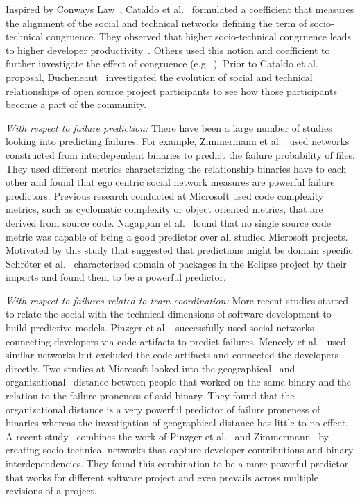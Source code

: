 Inspired by Conways Law~\cite{conway:datamination:1968}, Cataldo et
al.~\cite{cataldo:cscw:2006,cataldo:esem:2008} formulated a coefficient that
measures the alignment of the social and technical networks defining the term of
socio-technical congruence. They observed that higher socio-technical congruence
leads to higher developer
productivity~\cite{cataldo:cscw:2006,cataldo:esem:2008}. Others used this
notion and coefficient to further investigate the effect of congruence
(e.g.~\cite{valetto:msr:2007}). Prior to Cataldo et
al.~\cite{cataldo:cscw:2006,cataldo:esem:2008} proposal,
Ducheneaut~\cite{ducheneaut:cscw:2005} investigated the evolution of social and
technical relationships of open source project participants to see how those
participants become a part of the community.


\emph{With respect to failure prediction:}
There have been a large number of studies looking into predicting failures. For
example, Zimmermann et al.~\cite{zimmermann:icse:2008} used
networks constructed from interdependent binaries to predict the failure
probability of files. They used different metrics characterizing the relationship
binaries have to each other and found that ego centric social network measures
are powerful failure predictors. Previous research conducted at Microsoft used
code complexity metrics, such as cyclomatic complexity or object oriented
metrics, that are derived from source code. Nagappan et
al.~\cite{nagappan:icse:2006} found
that no single source code metric was capable of being a good
predictor over all studied Microsoft projects. Motivated by this study that
suggested that predictions might be domain specific Schr\"oter et
al.~\cite{schroeter:isese:2006} characterized domain of packages in the Eclipse
project by their imports and found them to be a powerful predictor.


\emph{With respect to failures related to team coordination:}
More recent studies started to relate the social with the technical
dimensions of software development to build predictive models. Pinzger et
al.~\cite{pinzger:fse:2008} successfully used social networks connecting
developers via code artifacts to predict failures. Meneely et
al.~\cite{meneely:fse:2008} used similar networks but excluded the code artifacts
and connected the developers directly. Two studies at Microsoft looked into the
geographical~\cite{bird:acm:2009} and organizational~\cite{nagappan:icse:2008}
distance between people that worked on the same binary and the relation to the
failure proneness of said binary. They found that the organizational distance is
a very powerful predictor of failure proneness of binaries whereas the
investigation of geographical distance has little to no effect. A recent
study~\cite{bird:issre:2009} combines the work of Pinzger et
al.~\cite{pinzger:fse:2008} and
Zimmermann~\cite{zimmermann:icse:2008} by creating
socio-technical networks that capture developer contributions and binary
interdependencies. They found this combination to be a more powerful predictor
that works for different software project and even prevails across multiple
revisions of a project.


